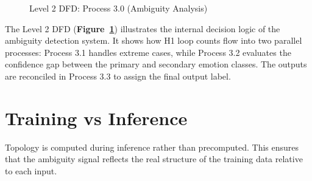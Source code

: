 \begin{figure}[H]
\caption{Level 2 DFD: Process 3.0 (Ambiguity Analysis)}
\label{fig:dfd2}
\end{figure}

The Level 2 DFD (\textbf{Figure~\ref{fig:dfd2}}) illustrates the internal decision logic of the ambiguity
detection system. It shows how H1 loop counts flow into two parallel processes: Process 3.1
handles extreme cases, while Process 3.2 evaluates the confidence gap between the primary and
secondary emotion classes. The outputs are reconciled in Process 3.3 to assign the final output
label.

\section{Training vs Inference}

Topology is computed during inference rather than precomputed. This ensures that the ambiguity
signal reflects the real structure of the training data relative to each input.
